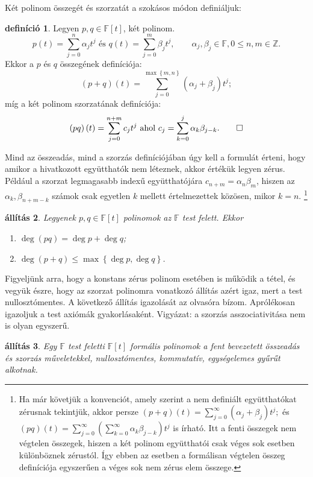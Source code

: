 \documentclass[9pt, a4paper, showtrims]{memoir}
\makeatletter
\renewenvironment{proof}[1][\proofname]
    {\par\pushQED{\qed}%
    \normalfont \topsep6\p@\@plus6\p@\relax
    \trivlist
    \item[\hskip\labelsep
        \itshape
    #1\@addpunct{:}]\ignorespaces}
    {\popQED\endtrivlist\@endpefalse}
\theoremstyle{plain}
\newtheorem{proposition}{állítás}[chapter]
\theoremstyle{remark}
\theoremstyle{definition}
\newtheorem{definition}[proposition]{definíció}
\makeatother
\begin{document}
Két polinom összegét és szorzatát a szokásos módon definiáljuk:
\begin{definition}\label{def:polmuveletek}
	Legyen $p,q\in\mathbb{F}[t]$, két polinom.
	\[
		p\left( t \right)
		=
		\sum_{j=0}^n\alpha_jt^j
		\text{ és }
		q\left( t \right)
		=
		\sum_{j=0}^m\beta_jt^j,
		\qquad
		\alpha_j,\beta_j\in\mathbb{F},
		0\leq n,m\in\mathbb{Z}.
	\]
	Ekkor a $p$ és $q$ összegének definíciója:
	\[
		\left( p+q \right)\left( t \right)
		=
		\sum_{j=0}^{\max{\left\{ m,n \right\}}}\left( \alpha_j+\beta_j \right)t^j;
	\]
	míg a két polinom szorzatának definíciója:
	\[
		\left( pq \right)\left( t \right)
		=
		\sum_{j=0}^{n+m}c_jt^j
		\text{ ahol }
		c_j
		=
		\sum_{k=0}^j\alpha_k\beta_{j-k}.
		\qedhere
	\]
\end{definition}
Mind az összeadás, mind a szorzás definíciójában úgy kell a formulát érteni,
hogy amikor a hivatkozott együtthatók nem léteznek,
akkor értékük legyen zérus.
Például a szorzat legmagasabb indexű együtthatójára
$c_{n+m}=\alpha_n\beta_m$, hiszen az $\alpha_k,\beta_{n+m-k}$ számok
csak egyetlen $k$ mellett értelmezettek közösen, mikor $k=n$.
\footnote
{
	Ha már követjük a konvenciót,
	amely szerint a nem definiált együtthatókat zérusnak tekintjük,
	akkor persze
	\(
	\left( p+q \right)\left( t \right)
	=
	\sum_{j=0}^\infty\left( \alpha_j+\beta_j \right)t^j;
	\)
	és
	\(
	\left( pq \right)\left( t \right)
	=
	\sum_{j=0}^\infty\left( \sum_{k=0}^\infty\alpha_k\beta_{j-k} \right)t^j
	\)
	is írható.
	Itt a fenti összegek nem végtelen összegek, hiszen a két polinom együtthatói
	csak véges sok esetben különböznek zérustól.
	Így ebben az esetben a formálisan végtelen összeg definíciója
	egyszerűen a véges sok nem zérus elem összege.
}
\begin{proposition}
	Legyenek $p,q\in\mathbb{F}[t]$ polinomok az $\mathbb{F}$ test felett.
	Ekkor
	\begin{enumerate}
		\item $\deg \left( pq \right)=\deg p+\deg q$;
		\item $\deg \left( p+q \right)\leq\max\left\{ \deg p,\deg q \right\}$.\qedhere
	\end{enumerate}
\end{proposition}
\begin{proof}
	Figyeljünk arra, hogy a konstans zérus polinom esetében is működik a tétel,
	és vegyük észre, hogy az szorzat polinomra vonatkozó állítás azért igaz,
	mert a test nullosztómentes.
\end{proof}
A következő állítás igazolását az olvasóra bízom.
Aprólékosan igazoljuk a test axiómák gyakorlásaként.
Vigyázat: a szorzás asszociativitása nem is olyan egyszerű.
\begin{proposition}
	Egy $\mathbb{F}$ test feletti $\mathbb{F}\left[ t \right]$ formális polinomok
	a fent bevezetett összeadás és szorzás műveletekkel,
	nullosztómentes,
	kommutatív, egységelemes gyűrűt alkotnak.
\end{proposition}
\end{document}
